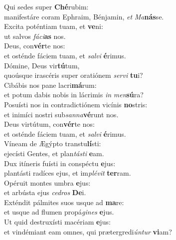 \evenverse Qui sedes super \textbf{Ché}rubim:~\*\\
\evenverse manifestáre coram Ephraim, Bénjamin, \textit{et} \textit{Ma}\textbf{nás}se.\\
\oddverse Excita poténtiam tuam, et \textbf{ve}ni:~\*\\
\oddverse ut salvos \textit{fá}\textit{ci}\textbf{as} nos.\\
\evenverse Deus, con\textbf{vér}te nos:~\*\\
\evenverse et osténde fáciem tuam, et \textit{sal}\textit{vi} \textbf{é}rimus.\\
\oddverse Dómine, Deus vir\textbf{tú}tum,~\*\\
\oddverse quoúsque irascéris super oratiónem \textit{ser}\textit{vi} \textbf{tu}i?\\
\evenverse Cibábis nos pane lacri\textbf{má}rum:~\*\\
\evenverse et potum dabis nobis in lácrimis \textit{in} \textit{men}\textbf{sú}ra?\\
\oddverse Posuísti nos in contradictiónem vicínis \textbf{no}stris:~\*\\
\oddverse et inimíci nostri sub\textit{san}\textit{na}\textbf{vé}runt nos.\\
\evenverse Deus virtútum, con\textbf{vér}te nos:~\*\\
\evenverse et osténde fáciem tuam, et \textit{sal}\textit{vi} \textbf{é}rimus.\\
\oddverse Víneam de Ægýpto transtu\textbf{lí}sti:~\*\\
\oddverse ejecísti Gentes, et plan\textit{tá}\textit{sti} \textbf{e}am.\\
\evenverse Dux itíneris fuísti in conspéctu \textbf{e}jus:~\*\\
\evenverse plantásti radíces ejus, et im\textit{plé}\textit{vit} \textbf{ter}ram.\\
\oddverse Opéruit montes umbra \textbf{e}jus:~\*\\
\oddverse et arbústa ejus \textit{ce}\textit{dros} \textbf{De}i.\\
\evenverse Exténdit pálmites suos usque ad \textbf{ma}re:~\*\\
\evenverse et usque ad flumen propá\textit{gi}\textit{nes} \textbf{e}jus.\\
\oddverse Ut quid destruxísti macériam \textbf{e}jus:~\*\\
\oddverse et vindémiant eam omnes, qui prætergredi\textit{ún}\textit{tur} \textbf{vi}am?\\
